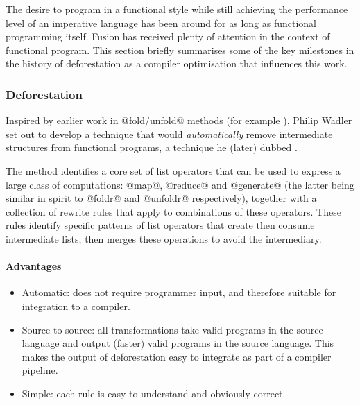 The desire to program in a functional style while still achieving the
performance level of an imperative language has been around for as long as
functional programming itself. Fusion has received plenty of attention in the
context of functional program. This section briefly summarises some of the key
milestones in the history of deforestation as a compiler optimisation that
influences this work.

\subsubsection{Deforestation}

Inspired by earlier work in @fold/unfold@ methods (for example
\citet{Burstall:1977kl}), Philip Wadler set out to develop a technique that
would \emph{automatically} remove intermediate structures from functional
programs, a technique he (later) dubbed 
\cite{Wadler:1981hy,Wadler:1990ix}.

The method identifies a core set of list operators that can be used to express a
large class of computations: @map@, @reduce@ and @generate@ (the
latter being similar in spirit to @foldr@ and @unfoldr@ respectively),
together with a collection of rewrite rules that apply to combinations of these
operators. These rules identify specific patterns of list operators that create
then consume intermediate lists, then merges these operations to avoid the
intermediary.

\paragraph{Advantages}
\begin{itemize}
    \item Automatic: does not require programmer input, and therefore suitable
        for integration to a compiler.

    \item Source-to-source: all transformations take valid programs in the
        source language and output (faster) valid programs in the source
        language. This makes the output of deforestation easy to integrate as
        part of a compiler pipeline.

    \item Simple: each rule is easy to understand and obviously correct.
\end{itemize}


